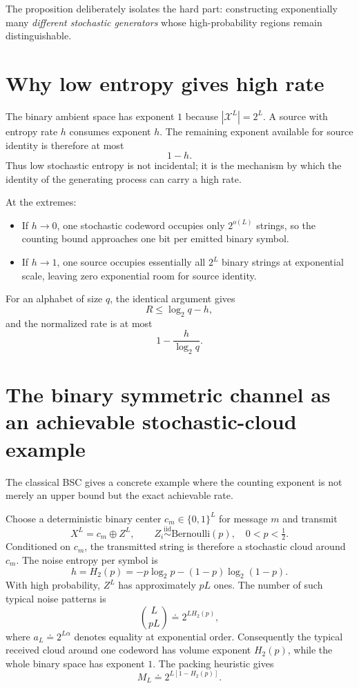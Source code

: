 \documentclass[11pt]{article}
\newcommand{\X}{\mathcal{X}}
\newcommand{\Hb}{H_2}
\begin{document}
The proposition deliberately isolates the hard part: constructing exponentially many \emph{different stochastic generators} whose high-probability regions remain distinguishable.

\section{Why low entropy gives high rate}
The binary ambient space has exponent $1$ because $|\X^L|=2^L$.  A source with entropy rate $h$ consumes exponent $h$.  The remaining exponent available for source identity is therefore at most
\[
1-h.
\]
Thus low stochastic entropy is not incidental; it is the mechanism by which the identity of the generating process can carry a high rate.

At the extremes:
\begin{itemize}[leftmargin=2em]
\item If $h\to0$, one stochastic codeword occupies only $2^{o(L)}$ strings, so the counting bound approaches one bit per emitted binary symbol.
\item If $h\to1$, one source occupies essentially all $2^L$ binary strings at exponential scale, leaving zero exponential room for source identity.
\end{itemize}

For an alphabet of size $q$, the identical argument gives
\[
R\le \log_2q-h,
\]
and the normalized rate is at most
\[
1-\frac{h}{\log_2q}.
\]

\section{The binary symmetric channel as an achievable stochastic-cloud example}
The classical BSC gives a concrete example where the counting exponent is not merely an upper bound but the exact achievable rate.

Choose a deterministic binary center $c_m\in\{0,1\}^L$ for message $m$ and transmit
\[
X^L=c_m\oplus Z^L,
\qquad
Z_i\stackrel{\mathrm{iid}}{\sim}\mathrm{Bernoulli}(p),
\quad 0<p<\tfrac12.
\]
Conditioned on $c_m$, the transmitted string is therefore a stochastic cloud around $c_m$.  The noise entropy per symbol is
\[
h=\Hb(p)
=-p\log_2p-(1-p)\log_2(1-p).
\]
With high probability, $Z^L$ has approximately $pL$ ones.  The number of such typical noise patterns is
\[
\binom{L}{pL}\doteq 2^{L\Hb(p)},
\]
where $a_L\doteq2^{L\alpha}$ denotes equality at exponential order.  Consequently the typical received cloud around one codeword has volume exponent $\Hb(p)$, while the whole binary space has exponent $1$.  The packing heuristic gives
\[
M_L\doteq2^{L[1-\Hb(p)]}.
\]
\end{document}
